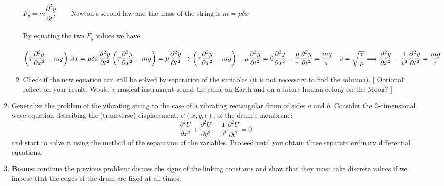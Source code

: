 \documentclass[fleqn]{article}
\begin{document}
\begin{enumerate}
\begin{enumerate}
        \textcolor{hwColor}{
          $F_y=m\dfrac{\partial^2 y }{\partial t^2}$ ~~~ Newton's second law and the mass of the string is $m= \mu \delta x$ \\
          \\
          By equating the two $F_y$ values we have: \\
          \\
          $
            \left(\tau \dfrac{\partial^2 y}{\partial x^2}-mg\right).\delta x=\mu \delta x\dfrac{\partial^2 y }{\partial t^2} \\
            \\
            \left(\tau \dfrac{\partial^2 y}{\partial x^2}-mg\right)=\mu \dfrac{\partial^2 y }{\partial t^2} \rightarrow \left(\tau \dfrac{\partial^2 y}{\partial x^2}-mg\right)-\mu \dfrac{\partial^2 y }{\partial t^2}=0 \\
            \\
            \\
            \dfrac{\partial^2 y}{\partial x^2}-\dfrac{\mu}{\tau} \dfrac{\partial^2 y }{\partial t^2}=\dfrac{mg}{\tau} ~~~ v=\sqrt{\dfrac{\tau}{\mu}} \\
            \\
            \Longrightarrow \dfrac{\partial^2 y}{\partial x^2}-\dfrac{1}{v^2} \dfrac{\partial^2 y }{\partial t^2}=\dfrac{mg}{\tau}
          $
        }

      \item Check if the new equation can still be solved by separation of the variables (it is not necessary to find the solution).  [ Optional: reflect on your result. Would a musical instrument sound the same on Earth and on a future human colony on the Moon?  ] 

      \end{enumerate}

    \item Generalize the problem of the vibrating string to the case of a vibrating rectangular drum of sides $a$ and $b$. Consider the 2-dimensional wave equation describing the (transverse) displacement, $U(x,y,t)$, of the drum's membrane:
    $$
    \frac{\partial^2 U}{\partial x^2} + \frac{\partial^2 U}{\partial y^2}  - \frac{1}{v^2}\frac{\partial^2 U}{\partial t^2}=0
    $$
    and start to solve it using the method of the separation of the variables. Proceed until you obtain three separate ordinary differential equations. 
    
    \item {\bf Bonus: } continue the previous problem: discuss the signs of the linking constants and show that they must take discrete values if we impose that the edges of the drum are fixed at all times. 
  \end{enumerate}
\end{document}
